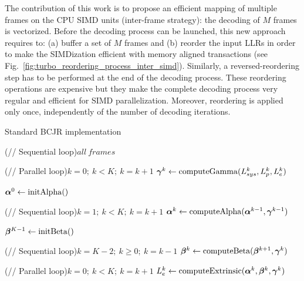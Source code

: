 The contribution of this work is to propose an efficient mapping of multiple
frames on the CPU SIMD units (inter-frame strategy): the decoding of $M$ frames
is vectorized. Before the decoding process can be launched, this new approach
requires to: (a) buffer a set of $M$ frames and (b) reorder the input LLRs in
order to make the SIMDization efficient with memory aligned transactions (see
Fig.~\ref{fig:turbo_reordering_process_inter_simd}). Similarly, a
reversed-reordering step has to be performed at the end of the decoding process.
These reordering operations are expensive but they make the complete decoding
process very regular and efficient for SIMD parallelization. Moreover,
reordering is applied only once, independently of the number of decoding
iterations.

\begin{algorithm}
  \caption{Standard BCJR implementation}
  \label{alg:turbo_bcjr}

  \For(// Sequential loop){$all~frames$}
  {
    \For(// Parallel loop){$k=0;~k<K;~k=k+1$}
    {
      $\boldsymbol{\gamma}^k\gets \operatorname*{computeGamma}(L_{sys}^k, L_{p}^k, L_{e}^k)$
    }

    $\boldsymbol{\alpha}^0\gets \operatorname*{initAlpha}()$

    \For(// Sequential loop){$k=1;~k<K;~k=k+1$}
    {
      $\boldsymbol{\alpha}^k\gets \operatorname*{computeAlpha}(\boldsymbol{\alpha}^{k-1}, \boldsymbol{\gamma}^{k-1})$
    }

    $\boldsymbol{\beta}^{K-1}\gets \operatorname*{initBeta}()$

    \For(// Sequential loop){$k=K-2;~k \geq 0;~k=k-1$}
    {
      $\boldsymbol{\beta}^k\gets \operatorname*{computeBeta}(\boldsymbol{\beta}^{k+1}, \boldsymbol{\gamma}^{k})$
    }

    \For(// Parallel loop){$k=0;~k<K;~k=k+1$}
    {
      $L_e^k\gets \operatorname*{computeExtrinsic}(\boldsymbol{\alpha}^k, \boldsymbol{\beta}^{k}, \boldsymbol{\gamma}^{k})$
    }
  }
\end{algorithm}

